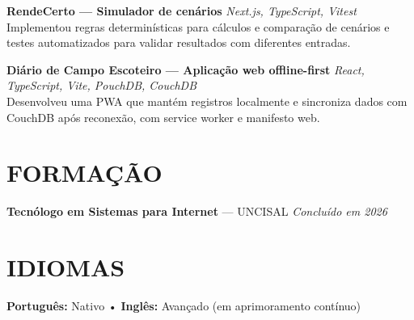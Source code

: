 \documentclass[10pt,a4paper]{article}
\begin{document}
\vspace{2pt}
\textbf{RendeCerto — Simulador de cenários} \hfill \textit{Next.js, TypeScript, Vitest}\\
Implementou regras determinísticas para cálculos e comparação de cenários e testes automatizados para validar resultados com diferentes entradas.

\vspace{2pt}
\textbf{Diário de Campo Escoteiro — Aplicação web offline-first} \hfill \textit{React, TypeScript, Vite, PouchDB, CouchDB}\\
Desenvolveu uma PWA que mantém registros localmente e sincroniza dados com CouchDB após reconexão, com service worker e manifesto web.
\section*{FORMAÇÃO}
\textbf{Tecnólogo em Sistemas para Internet} — UNCISAL \hfill \textit{Concluído em 2026}
\section*{IDIOMAS}
\textbf{Português:} Nativo \quad • \quad \textbf{Inglês:} Avançado (em aprimoramento contínuo)
\end{document}
